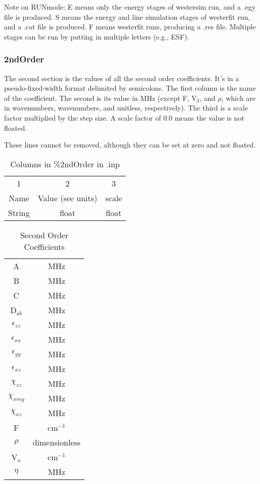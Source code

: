 \documentclass{article}
\begin{document}
Note on RUNmode: E means only the energy stages of westersim run, and a .egy file is produced. S means the energy and line simulation stages of westerfit run, and a .cat file is produced. F means westerfit runs, producing a .res file. Multiple stages can be run by putting in multiple letters (e.g., ESF).


\subsubsection{2ndOrder}

The second section is the values of all the second order coefficients. It's in a pseudo-fixed-width format delimited by semicolons. The first column is the name of the coefficient. The second is its value in MHz (except F, V$_3$, and $\rho$, which are in wavenumbers, wavenumbers, and unitless, respectively). The third is a scale factor multiplied by the step size. A scale factor of 0.0 means the value is not floated.

These lines cannot be removed, although they can be set at zero and not floated.

\begin{table}[h]
	\caption{Columns in \%2ndOrder in .inp}
	\begin{tabular}{c c c}
		\hline
		1 & 2 & 3\\
		Name & Value (see units) & scale \\
		String & float & float \\
	\end{tabular}
\end{table}

\begin{table}[h]
		\caption{Second Order Coefficients}
\begin{tabular}{c c}
	\hline
	A & MHz \\
	B & MHz \\
	C & MHz \\
	D$_{ab}$ & MHz \\
	$\epsilon_{zz}$ & MHz \\
	$\epsilon_{xx}$& MHz \\
	$\epsilon_{yy}$ & MHz \\
	$\epsilon_{xz}$  & MHz \\
	$\chi_{zz}$ & MHz \\
	$\chi_{xmy}$ & MHz \\
	$\chi_{xz}$ & MHz \\
	F & cm$^{-1}$ \\
	$\rho$ & dimensionless \\
	V$_n$ & cm$^{-1}$ \\
	$\eta$ & MHz \\
\end{tabular}
\end{table}
\end{document}
